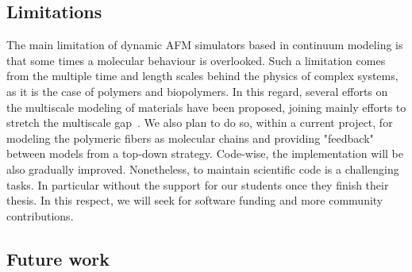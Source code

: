 \documentclass[letterpaper,compsoc,twoside]{IEEEtran}
\begin{document}



\subsection{Limitations%
  \label{limitations}%
}

The main limitation of dynamic AFM simulators based in continuum modeling is that some times a molecular behaviour is overlooked. Such a limitation comes from the multiple time and length scales behind the physics of complex systems, as it is the case of polymers and biopolymers. In this regard, several efforts on the multiscale modeling of materials have been proposed, joining mainly efforts to stretch the multiscale gap~\cite{GuzmanCPC2019}. We also plan to do so, within a current project, for modeling the polymeric fibers as molecular chains and providing "feedback" between models from a top-down strategy.
Code-wise, the implementation will be also gradually improved. Nonetheless, to maintain scientific code is a challenging tasks. In particular without the support for our students once they finish their thesis. In this respect, we will seek for software funding and more community contributions.

\subsection{Future work%
  \label{future-work}%
}
\end{document}
